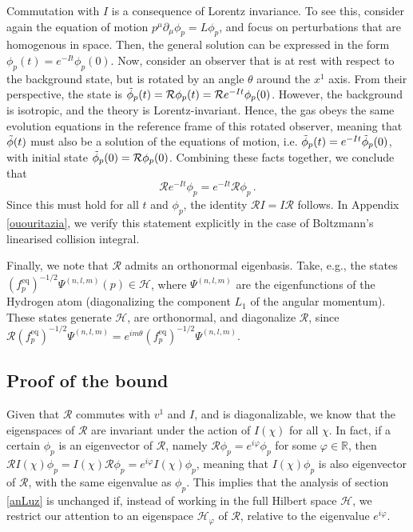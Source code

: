 \documentclass[a4paper, amsfonts, amssymb, amsmath, reprint, showkeys, nofootinbib, twoside, onecolumn,notitlepage]{revtex4-2}
\theoremstyle{definition}
\theoremstyle{theorem}
\theoremstyle{corollary}
\begin{document}
Commutation with $I$ is a consequence of Lorentz invariance. To see this, consider again the equation of motion $p^\mu \partial_\mu \phi_p=L\phi_p$, and focus on perturbations that are homogenous in space. Then, the general solution can be expressed in the form $\phi_p(t)=e^{-It}\phi_p(0)$. Now, consider an observer that is at rest with respect to the background state, but is rotated by an angle $\theta$ around the $x^1$ axis. From their perspective, the state is $\Tilde{\phi}_p(t)=\mathcal{R}\phi_p(t)=\mathcal{R}e^{-It}\phi_p(0)$. However, the background is isotropic, and the theory is Lorentz-invariant. Hence, the gas obeys the same evolution equations in the reference frame of this rotated observer, meaning that $\Tilde{\phi}(t)$ must also be a solution of the equations of motion, i.e. $\Tilde{\phi}_p(t)=e^{-It}\Tilde{\phi}_p(0)$, with initial state $\Tilde{\phi}_p(0)=\mathcal{R}\phi_p(0)$. Combining these facts together, we conclude that
\begin{equation}
\mathcal{R}e^{-It}\phi_p = e^{-It}\mathcal{R}\phi_p \, .
\end{equation}
Since this must hold for all $t$ and $\phi_p$, the identity $\mathcal{R}I=I\mathcal{R}$ follows. In Appendix \ref{ououritazia}, we verify this statement explicitly in the case of Boltzmann's linearised collision integral.

Finally, we note that $\mathcal{R}$ admits an orthonormal eigenbasis. Take, e.g., the states $(f^{\text{eq}}_p)^{-1/2} \Psi^{(n,l,m)}(p)\in \mathcal{H}$, where $\Psi^{(n,l,m)}$ are the eigenfunctions of the Hydrogen atom (diagonalizing the component $L_1$ of the angular momentum). These states generate $\mathcal{H}$, are orthonormal, and diagonalize $\mathcal{R}$, since $\mathcal{R}(f^{\text{eq}}_p)^{-1/2} \Psi^{(n,l,m)}=e^{im\theta}(f^{\text{eq}}_p)^{-1/2} \Psi^{(n,l,m)}$.


\subsection{Proof of the bound}

Given that $\mathcal{R}$ commutes with $v^1$ and $I$, and is diagonalizable, we know that the eigenspaces of $\mathcal{R}$ are invariant under the action of $I(\chi)$ for all $\chi$. In fact, if a certain $\phi_p$ is an eigenvector of $\mathcal{R}$, namely $\mathcal{R}\phi_p = e^{i\varphi} \phi_p$ for some $\varphi \in \mathbb{R}$, then $\mathcal{R}I(\chi)\phi_p=I(\chi)\mathcal{R}\phi_p=e^{i\varphi}I(\chi)\phi_p$, meaning that $I(\chi)\phi_p$ is also eigenvector of $\mathcal{R}$, with the same eigenvalue as $\phi_p$. This implies that the analysis of section \ref{anLuz} is unchanged if, instead of working in the full Hilbert space $\mathcal{H}$, we restrict our attention to an eigenspace $\mathcal{H}_{\varphi}$ of $\mathcal{R}$, relative to the eigenvalue $e^{i\varphi}$.
\end{document}
